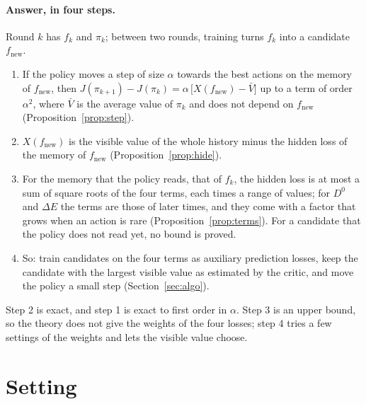\documentclass[11pt]{article}
\theoremstyle{definition}
\newcommand{\fn}{f_{\mathrm{new}}}
\newcommand{\dE}{\Delta E}
\begin{document}
\paragraph{Answer, in four steps.} Round $k$ has $f_k$ and $\pi_k$; between two rounds, training turns $f_k$ into a candidate $\fn$.
\begin{enumerate}
\item If the policy moves a step of size $\alpha$ towards the best actions on the memory of $\fn$, then $J(\pi_{k+1})-J(\pi_k)=\alpha\,\big[X(\fn)-\bar V\big]$ up to a term of order $\alpha^2$, where $\bar V$ is the average value of $\pi_k$ and does not depend on $\fn$ (Proposition~\ref{prop:step}).
\item $X(\fn)$ is the visible value of the whole history minus the hidden loss of the memory of $\fn$ (Proposition~\ref{prop:hide}).
\item For the memory that the policy reads, that of $f_k$, the hidden loss is at most a sum of square roots of the four terms, each times a range of values; for $D^0$ and $\dE$ the terms are those of later times, and they come with a factor that grows when an action is rare (Proposition~\ref{prop:terms}). For a candidate that the policy does not read yet, no bound is proved.
\item So: train candidates on the four terms as auxiliary prediction losses, keep the candidate with the largest visible value as estimated by the critic, and move the policy a small step (Section~\ref{sec:algo}).
\end{enumerate}
Step 2 is exact, and step 1 is exact to first order in $\alpha$. Step 3 is an upper bound, so the theory does not give the weights of the four losses; step 4 tries a few settings of the weights and lets the visible value choose.

\section{Setting}
\end{document}
